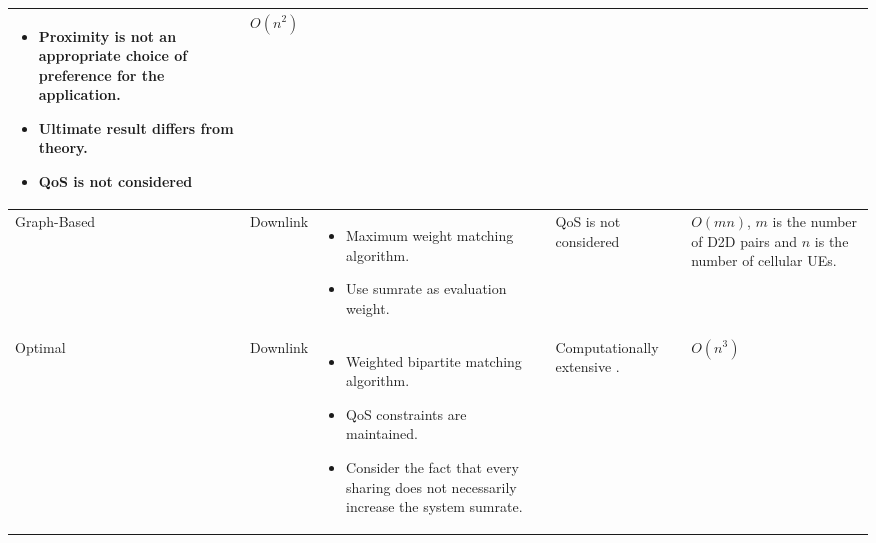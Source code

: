 \documentclass[times]{dacauth}
\begin{document}
\begin{center}
\begin{table}[h!]
\begin{tabular}{ | m{4em} | m{4em} | m{10em} | m{9em}| m{6em} | }
\begin{itemize}[leftmargin=*]
    \item Proximity is not an appropriate choice of preference for the application.
    \item Ultimate result differs from theory.
    \item QoS is not considered
 \end{itemize}
&$O(n^2)$\\

\hline
Graph-Based	\cite{zhang}
&Downlink	
&\begin{itemize}[leftmargin=*]
    \item Maximum weight matching algorithm.
    \item Use sumrate as evaluation weight.
 \end{itemize}
&QoS is not considered
&$O(mn)$, $m$ is the number of D2D pairs and $n$ is the number of cellular UEs.\\

\hline
Optimal \cite{ccnc}	
&Downlink 	
&\begin{itemize}[leftmargin=*]
    \item Weighted bipartite matching algorithm.
    \item QoS constraints are maintained.
    \item Consider the fact that every sharing does not necessarily increase the system sumrate. 
 \end{itemize}
&Computationally extensive .	
&$O(n^3)$\\
\hline

\end{tabular}

\end{table}
\end{center}
\end{document}
